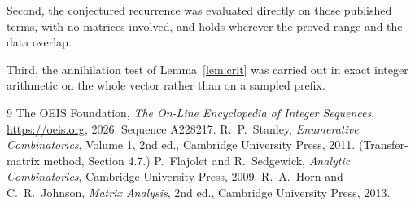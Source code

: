 \documentclass[11pt,a4paper]{article}
\theoremstyle{plain}
\theoremstyle{definition}
\begin{document}
Second, the conjectured recurrence was evaluated directly on those published terms, with no
matrices involved, and holds wherever the proved range and the data overlap.

Third, the annihilation test of Lemma~\ref{lem:crit} was carried out in exact integer
arithmetic on the whole vector rather than on a sampled prefix.

\begin{thebibliography}{9}
 The OEIS Foundation, \emph{The On-Line Encyclopedia of Integer
Sequences}, \url{https://oeis.org}, 2026. Sequence A228217.
 R.~P.~Stanley, \emph{Enumerative Combinatorics}, Volume 1, 2nd ed.,
Cambridge University Press, 2011. (Transfer-matrix method, Section 4.7.)
 P.~Flajolet and R.~Sedgewick, \emph{Analytic Combinatorics}, Cambridge
University Press, 2009.
 R.~A.~Horn and C.~R.~Johnson, \emph{Matrix Analysis}, 2nd ed., Cambridge
University Press, 2013.
\end{thebibliography}
\end{document}
